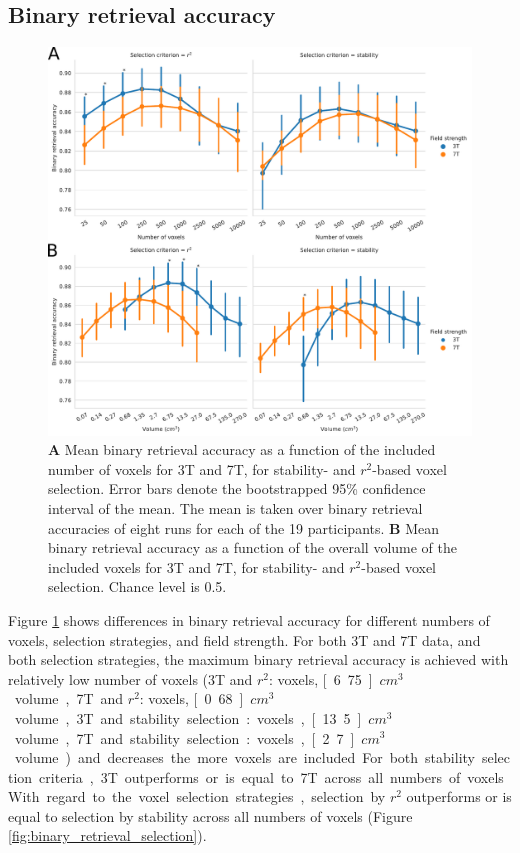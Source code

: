 \subsection*{Binary retrieval accuracy}

\begin{figure}[!htb]
  \centering
  \includegraphics[width=\linewidth]{pics/binary.pdf}
	
  \caption{\textbf{A} Mean binary retrieval accuracy as a function of the
  included number of voxels for 3T and 7T, for stability- and $r^2$-based
  voxel selection. Error bars denote the bootstrapped 95\% confidence interval
  of the mean. The mean is taken over binary retrieval accuracies of eight runs
  for each of the 19 participants. \textbf{B} Mean binary retrieval accuracy as
a function of the overall volume of the included voxels for 3T and 7T, for
stability- and $r^2$-based voxel selection. Chance level is 0.5.
}

 \label{fig:binary_retrieval}\end{figure}


Figure \ref{fig:binary_retrieval} shows differences in binary retrieval accuracy for different numbers of voxels, selection strategies, and field strength.
For both 3T and 7T data, and both selection strategies, the maximum binary retrieval accuracy is achieved with relatively low number of voxels (3T and $r^{2}$: \unit[250]{voxels}, \unit[6.75]{$cm^{3}$} volume, 7T and $r^{2}$: \unit[500]{voxels}, \unit[0.68]{$cm^{3}$} volume, 3T and stability selection: \unit[500]{voxels}, \unit[13.5]{$cm^{3}$} volume, 7T and stability selection: \unit[1000]{voxels}, \unit[2.7]{$cm^{3}$} volume) and decreases the more voxels are included. For both stability selection criteria, 3T outperforms or is equal to 7T across all numbers of voxels. With regard to the voxel selection strategies, selection by $r^{2}$ outperforms or is equal to selection by stability across all numbers of voxels (Figure \ref{fig:binary_retrieval_selection}).

